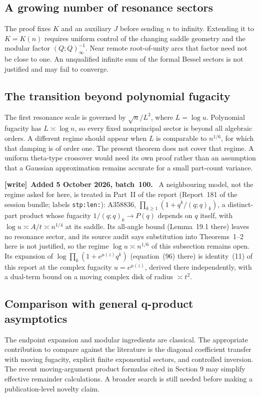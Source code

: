 \documentclass[11pt,letterpaper]{article}
\newenvironment{writenote}[1][]{\par\smallskip\begingroup\small
 \noindent\textbf{[write]}\if\relax\detokenize{#1}\relax\else~\textbf{#1.}\fi\ }%
 {\par\endgroup\smallskip}
\begin{document}
\subsection{A growing number of resonance sectors}
The proof fixes $K$ and an auxiliary $J$ before sending $n$ to infinity. Extending it to $K=K(n)$ requires uniform control of the changing saddle geometry and the modular factor $(Q;Q)_\infty^{-1}$. Near remote root-of-unity arcs that factor need not be close to one. An unqualified infinite sum of the formal Bessel sectors is not justified and may fail to converge.

\subsection{The transition beyond polynomial fugacity}
The first resonance scale is governed by $\sqrt n/L^3$, where $L=\log u$. Polynomial fugacity has $L\asymp\log n$, so every fixed nonprincipal sector is beyond all algebraic orders. A different regime should appear when $L$ is comparable to $n^{1/6}$, for which that damping is of order one. The present theorem does not cover that regime. A uniform theta-type crossover would need its own proof rather than an assumption that a Gaussian approximation remains accurate for a small part-count variance.

\begin{writenote}[Added 5 October 2026, batch~100]
A neighbouring model, not the regime asked for here, is treated in Part~II
of the report
 (Report~181
of the session bundle; labels \texttt{stp:len:}): A358836,
$\prod_{k\ge1}(1+q^k/(q;q)_k)$, a distinct-part product whose fugacity
$1/(q;q)_k\to P(q)$ depends on $q$ itself, with $\log u\asymp A/t\asymp n^{1/4}$
at its saddle. Its all-angle bound (Lemma~19.1 there) leaves no resonance
sector, and its source audit says substitution into Theorems~1--2 here is not
justified, so the regime $\log u\asymp n^{1/6}$ of this subsection remains
open. Its expansion of $\log\prod_k(1+e^{\mu(z)}q^k)$ (equation~(96) there)
is identity~(11) of this report at the complex fugacity $u=e^{\mu(z)}$,
derived there independently, with a dual-term bound on a moving complex
disk of radius $\asymp t^2$.
\end{writenote}

\subsection{Comparison with general q-product asymptotics}
The endpoint expansion and modular ingredients are classical. The appropriate contribution to compare against the literature is the diagonal coefficient transfer with moving fugacity, explicit finite exponential sectors, and controlled inversion. The recent moving-argument product formulas cited in Section 9 may simplify effective remainder calculations. A broader search is still needed before making a publication-level novelty claim.
\end{document}
